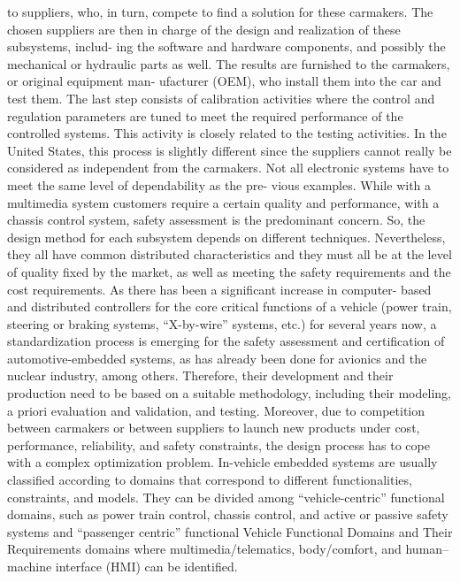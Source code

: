 to suppliers, who, in turn, compete to find a solution for these carmakers. The chosen
suppliers are then in charge of the design and realization of these subsystems, includ-
ing the software and hardware components, and possibly the mechanical or hydraulic
parts as well. The results are furnished to the carmakers, or original equipment man-
ufacturer (OEM), who install them into the car and test them. The last step consists of
calibration activities where the control and regulation parameters are tuned to meet
the required performance of the controlled systems. This activity is closely related to
the testing activities. In the United States, this process is slightly different since the
suppliers cannot really be considered as independent from the carmakers.
Not all electronic systems have to meet the same level of dependability as the pre-
vious examples. While with a multimedia system customers require a certain quality
and performance, with a chassis control system, safety assessment is the predominant
concern. So, the design method for each subsystem depends on different techniques.
Nevertheless, they all have common distributed characteristics and they must all be
at the level of quality fixed by the market, as well as meeting the safety requirements
and the cost requirements. As there has been a significant increase in computer-
based and distributed controllers for the core critical functions of a vehicle (power
train, steering or braking systems, “X-by-wire” systems, etc.) for several years now,
a standardization process is emerging for the safety assessment and certification of
automotive-embedded systems, as has already been done for avionics and the nuclear
industry, among others. Therefore, their development and their production need to
be based on a suitable methodology, including their modeling, a priori evaluation and
validation, and testing. Moreover, due to competition between carmakers or between
suppliers to launch new products under cost, performance, reliability, and safety
constraints, the design process has to cope with a complex optimization problem.
In-vehicle embedded systems are usually classified according to domains
that correspond to different functionalities, constraints, and models. They can
be divided among “vehicle-centric” functional domains, such as power train control,
chassis control, and active or passive safety systems and “passenger centric” functional
Vehicle Functional Domains and Their Requirements
domains where multimedia/telematics, body/comfort, and human–machine interface
(HMI) can be identified.



